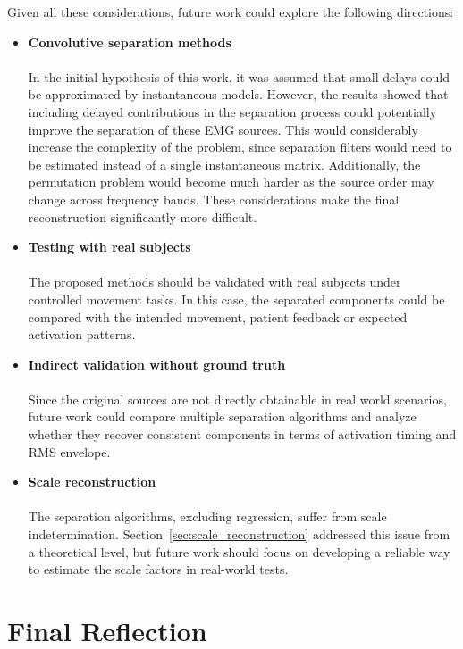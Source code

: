 Given all these considerations, future work could explore the following directions:

\begin{itemize}
    \item \textbf{Convolutive separation methods} 
    \\ \\
    In the initial hypothesis of this work, it was assumed that small delays could
be approximated by instantaneous models. However, the results showed that
including delayed contributions in the separation process could potentially
improve the separation of these EMG sources. This would considerably increase
the complexity of the problem, since separation filters would need to be estimated
instead of a single instantaneous matrix. Additionally, the permutation problem
would become much harder as the source order may change across frequency bands. These considerations
make the final reconstruction significantly more difficult.

    \item \textbf{Testing with real subjects}
    \\ \\
    The proposed methods should be validated with real subjects under controlled movement tasks. In this case, the separated components could be compared with the intended movement, patient feedback or expected activation patterns.

    \item \textbf{Indirect validation without ground truth}
    \\ \\
    Since the original sources are not directly obtainable in real world scenarios, future work could compare multiple separation algorithms and analyze whether they recover consistent components in terms of activation timing and RMS envelope.

    \item \textbf{Scale reconstruction}
    \\ \\
    The separation algorithms, excluding regression, suffer from scale indetermination. Section~\ref{sec:scale_reconstruction} addressed this issue from a theoretical level, but future work should focus on developing a reliable way to estimate the scale factors in real-world tests.
\end{itemize}

\clearpage

\section{Final Reflection}


